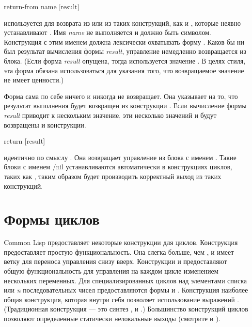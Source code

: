 \begin{defspec}
return-from name [result]

 используется для возврата из  или из таких
конструкций, как  и , которые неявно устанавливают
.
Имя \emph{name} не выполняется и должно быть символом.
Конструкция  с этим именем должна лексически охватывать форму
.
Каков бы ни был результат вычисления формы \emph{result}, управление немедленно
возвращается из блока.
(Если форма \emph{result} опущена, тогда используется значение {\nil}. В целях
стиля, эта форма обязана использоваться для указания того, что возвращаемое
значение не имеет ценности.)

Форма  сама по себе ничего и никогда не возвращает.
Она указывает на то, что результат выполнения будет возвращен из конструкции
.
Если вычисление формы \emph{result} приводит к нескольким значение, эти
несколько значений и будут возвращены и конструкции.
\end{defspec}

\begin{defmac}
return [result]

 идентично по смыслу 
. Она возвращает управление из блока с
именем {\nil}.
Такие блоки с именем {/nil} устанавливаются автоматически в конструкциях циклов,
таких как , таким образом  будет производить корректный
выход из таких конструкций.
\end{defmac}

\section{Формы циклов}

Common Lisp предоставляет некоторые конструкции для циклов. Конструкция
 предоставляет простую функциональность. Она слегка больше, чем
, и имеет ветку для переноса управления снизу вверх.
Конструкции  и  предоставляют общую функциональность для
управления на каждом цикле изменением нескольких переменных.
Для специализированных циклов над элементами списка или \emph{n}
последовательных чисел предоставляются формы  и .
Конструкция  наиболее общая конструкция, которая внутри себя
позволяет использование выражений . (Традиционная конструкция 
--- это синтез ,  и .)
Большинство конструкций циклов позволяют определенные статически нелокальные
выходы (смотрите  и ).

